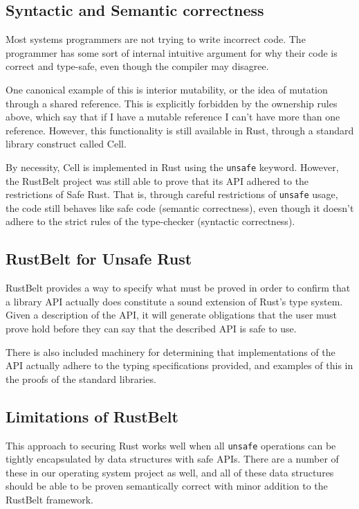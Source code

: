 \documentclass[12pt]{article}
\begin{document}
\subsection{Syntactic and Semantic correctness}
Most systems programmers are not trying to write incorrect code. The programmer has some sort of internal intuitive argument for why their code is correct and type-safe, even though the compiler may disagree.

One canonical example of this is interior mutability, or the idea of mutation through a shared reference. This is explicitly forbidden by the ownership rules above, which say that if I have a mutable reference I can't have more than one reference. However, this functionality is still available in Rust, through a standard library construct called Cell.

By necessity, Cell is implemented in Rust using the \texttt{unsafe} keyword. However, the RustBelt project was still able to prove that its API adhered to the restrictions of Safe Rust. That is, through careful restrictions of \texttt{unsafe} usage, the code still behaves like safe code (semantic correctness), even though it doesn't adhere to the strict rules of the type-checker (syntactic correctness).

\subsection{RustBelt for Unsafe Rust}
RustBelt provides a way to specify what must be proved in order to confirm that a library API actually does constitute a sound extension of Rust's type system. Given a description of the API, it will generate obligations that the user must prove hold before they can say that the described API is safe to use.

There is also included machinery for determining that implementations of the API actually adhere to the typing specifications provided, and examples of this in the proofs of the standard libraries.

\subsection{Limitations of RustBelt}
This approach to securing Rust works well when all \texttt{unsafe} operations can be tightly encapsulated by data structures with safe APIs. There are a number of these in our operating system project as well, and all of these data structures should be able to be proven semantically correct with minor addition to the RustBelt framework.
\end{document}
